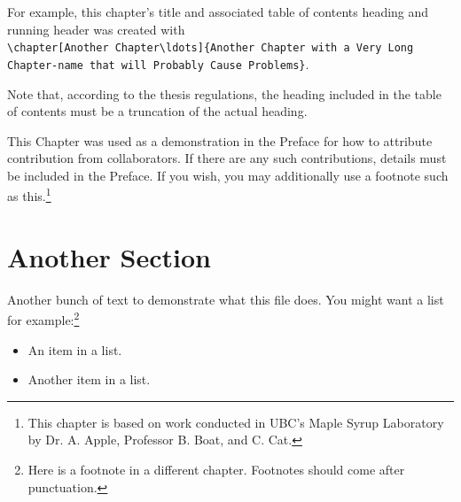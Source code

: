 \documentclass[msc,oneside]{ubcthesis}
\begin{document}
For example, this chapter's title and associated table of contents heading and
running header was created with\\
\verb|\chapter[Another Chapter\ldots]{Another Chapter with a Very Long|\\
\verb|Chapter-name that will Probably Cause Problems}|.

Note that, according to the thesis regulations, the heading included
in the table of contents must be a truncation of the actual heading.

This Chapter was used as a demonstration in the Preface for how to
attribute contribution from collaborators.  If there are any such
contributions, details must be included in the Preface.  If you wish,
you may additionally use a footnote such as this.\footnote{This
  chapter is based on work conducted in UBC's Maple Syrup Laboratory
  by Dr. A. Apple, Professor B. Boat, and C. Cat.}

\section{Another Section}
Another bunch of text to demonstrate what this file does.
You might want a list for example:\footnote{Here is a footnote in a
  different chapter.  Footnotes should come after punctuation.}
\begin{itemize}
\item An item in a list.
\item Another item in a list.
\end{itemize}
\end{document}
